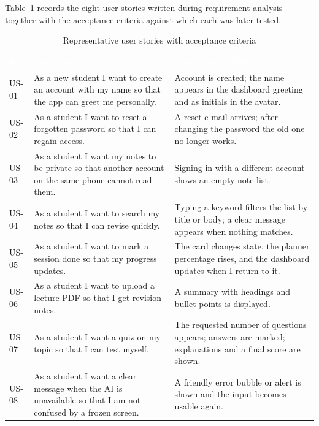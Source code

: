 \documentclass[12pt,a4paper,oneside]{report}
\begin{document}
Table~\ref{tab:stories} records the eight user stories written during requirement analysis together with the acceptance criteria against which each was later tested.

\begin{table}[H]
\centering
\caption{Representative user stories with acceptance criteria}
\label{tab:stories}
\small
\begin{tabularx}{\textwidth}{@{}p{1.1cm}Xp{4.6cm}@{}}
\toprule
\rowcolor{tblhead} \textcolor{white}{\textbf{ID}} &
\textcolor{white}{\textbf{User story}} &
\textcolor{white}{\textbf{Acceptance criteria}} \\
\midrule
US-01 & As a new student I want to create an account with my name so that the app
   can greet me personally. & Account is created; the name appears in the dashboard
   greeting and as initials in the avatar. \\
US-02 & As a student I want to reset a forgotten password so that I can regain
   access. & A reset e-mail arrives; after changing the password the old one no
   longer works. \\
US-03 & As a student I want my notes to be private so that another account on the
   same phone cannot read them. & Signing in with a different account shows an empty
   note list. \\
US-04 & As a student I want to search my notes so that I can revise quickly. &
   Typing a keyword filters the list by title or body; a clear message appears when
   nothing matches. \\
US-05 & As a student I want to mark a session done so that my progress updates. &
   The card changes state, the planner percentage rises, and the dashboard updates
   when I return to it. \\
US-06 & As a student I want to upload a lecture PDF so that I get revision notes. &
   A summary with headings and bullet points is displayed. \\
US-07 & As a student I want a quiz on my topic so that I can test myself. & The
   requested number of questions appears; answers are marked; explanations and a
   final score are shown. \\
US-08 & As a student I want a clear message when the AI is unavailable so that I am
   not confused by a frozen screen. & A friendly error bubble or alert is shown and
   the input becomes usable again. \\
\bottomrule
\end{tabularx}
\end{table}
\end{document}
